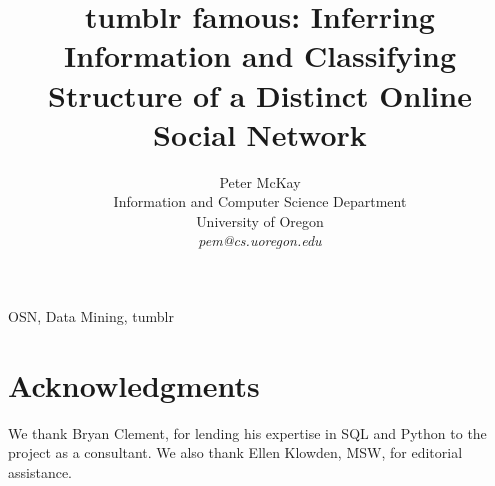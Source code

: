 \documentclass[10pt,twocolumn]{IEEEtran11}
\begin{document}
%


\title{\Large \bf tumblr famous: Inferring Information and Classifying Structure of a Distinct Online Social Network
}
\author{
Peter McKay\\
Information and Computer Science Department\\
University of Oregon\\
{\em pem@cs.uoregon.edu}
}
\maketitle


\begin{keywords} 
OSN, Data Mining, tumblr
\end{keywords}









\section{Acknowledgments}
We thank Bryan Clement, for lending his expertise in SQL and Python to 
the project as a consultant. We also thank Ellen Klowden, MSW, for 
editorial assistance.


\end{document}
